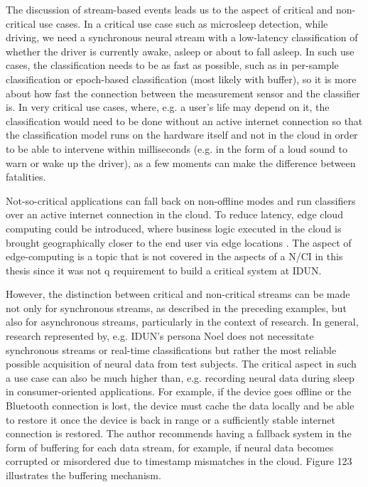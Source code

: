 The discussion of stream-based events leads us to the aspect of critical and non-critical use cases. In a critical use case such as microsleep detection, while driving, we need a synchronous neural stream with a low-latency classification of whether the driver is currently awake, asleep or about to fall asleep. In such use cases, the classification needs to be as fast as possible, such as in per-sample classification or epoch-based classification (most likely with buffer), so it is more about how fast the connection between the measurement sensor and the classifier is. In very critical use cases, where, e.g. a user's life may depend on it, the classification would need to be done without an active internet connection so that the classification model runs on the hardware itself and not in the cloud in order to be able to intervene within milliseconds (e.g. in the form of a loud sound to warn or wake up the driver), as a few moments can make the difference between fatalities.

Not-so-critical applications can fall back on non-offline modes and run classifiers over an active internet connection in the cloud. To reduce latency, edge cloud computing could be introduced, where business logic executed in the cloud is brought geographically closer to the end user via edge locations \citep{nomios_what_nodate}. The aspect of edge-computing is a topic that is not covered in the aspects of a N/CI in this thesis since it was not q requirement to build a critical system at IDUN.

However, the distinction between critical and non-critical streams can be made not only for synchronous streams, as described in the preceding examples, but also for asynchronous streams, particularly in the context of research. In general, research represented by, e.g. IDUN's persona Noel does not necessitate synchronous streams or real-time classifications but rather the most reliable possible acquisition of neural data from test subjects. The critical aspect in such a use case can also be much higher than, e.g. recording neural data during sleep in consumer-oriented applications. For example, if the device goes offline or the Bluetooth connection is lost, the device must cache the data locally and be able to restore it once the device is back in range or a sufficiently stable internet connection is restored. The author recommends having a fallback system in the form of buffering for each data stream, for example, if neural data becomes corrupted or misordered due to timestamp mismatches in the cloud. Figure 123 illustrates the buffering mechanism.

